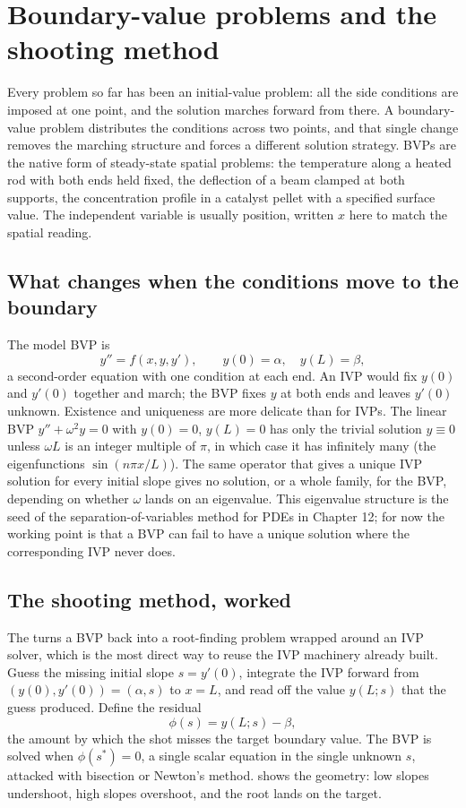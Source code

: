 \section{Boundary-value problems and the shooting method}

Every problem so far has been an initial-value problem: all the side
conditions are imposed at one point, and the solution marches forward
from there. A boundary-value problem distributes the conditions
across two points, and that single change removes the marching
structure and forces a different solution strategy. BVPs are the
native form of steady-state spatial problems: the temperature along
a heated rod with both ends held fixed, the deflection of a beam
clamped at both supports, the concentration profile in a catalyst
pellet with a specified surface value. The independent variable is
usually position, written $x$ here to match the spatial reading.

\subsection{What changes when the conditions move to the boundary}

The model BVP is
\[
y'' = f(x, y, y'), \qquad y(0) = \alpha, \quad y(L) = \beta,
\]
a second-order equation with one condition at each end. An IVP would
fix $y(0)$ and $y'(0)$ together and march; the BVP fixes $y$ at both
ends and leaves $y'(0)$ unknown. Existence and uniqueness are more
delicate than for IVPs. The linear BVP $y'' + \omega^{2} y = 0$ with
$y(0) = 0$, $y(L) = 0$ has only the trivial solution $y \equiv 0$
unless $\omega L$ is an integer multiple of $\pi$, in which case it
has infinitely many (the eigenfunctions $\sin(n\pi x/L)$). The same
operator that gives a unique IVP solution for every initial slope
gives no solution, or a whole family, for the BVP, depending on
whether $\omega$ lands on an eigenvalue. This eigenvalue structure
is the seed of the separation-of-variables method for PDEs in
Chapter 12; for now the working point is that a BVP can fail to have
a unique solution where the corresponding IVP never does.

\subsection{The shooting method, worked}

The  turns a BVP back into a root-finding
problem wrapped around an IVP solver, which is the most direct way to
reuse the IVP machinery already built. Guess the missing initial
slope $s = y'(0)$, integrate the IVP forward from $(y(0), y'(0)) =
(\alpha, s)$ to $x = L$, and read off the value $y(L; s)$ that the
guess produced. Define the residual
\[
\phi(s) = y(L; s) - \beta,
\]
the amount by which the shot misses the target boundary value. The
BVP is solved when $\phi(s^{\ast}) = 0$, a single scalar equation in
the single unknown $s$, attacked with bisection or Newton's method.
 shows the geometry: low slopes
undershoot, high slopes overshoot, and the root lands on the target.

